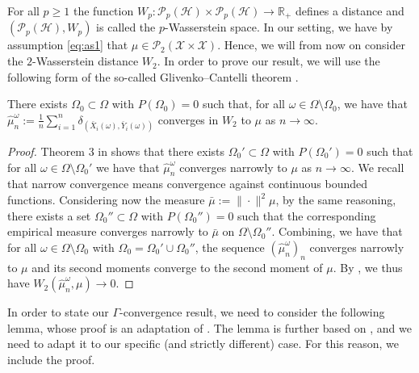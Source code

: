 \documentclass[onefignum,onetabnum]{siamonline250211}
\newcommand{\bX}{\bar{X}}
\newcommand{\bY}{\bar{Y}}
\newcommand{\cX}{\mathcal{X}}
\begin{document}
For all $p\geq 1$ the function $W_p: \mathcal{P}_p(\mathcal{H})\times \mathcal{P}_p(\mathcal{H}) \to \mathbb{R}_+$ defines a distance and $(\mathcal{P}_p(\mathcal{H}), W_p)$ is called the $p$-Wasserstein space. In our setting, we have by assumption \cref{eq:as1} that $\mu\in\mathcal{P}_2(\cX\times\cX)$. Hence, we will from now on consider the $2$-Wasserstein distance $W_2$. In order to prove our result, we will use the following form of the so-called Glivenko--Cantelli theorem \cite[Theorem 3]{Varadarajan}.

\begin{theorem}\label{thm:GliCa} There exists $\Omega_0\subset \Omega$ with $P(\Omega_0)=0$ such that, for all $\omega \in \Omega\setminus \Omega_0$, we have that $\hat \mu^\omega_n:=\frac{1}{n}\sum_{i=1}^n\delta_{(\bX_i(\omega), \bY_i(\omega))}$ converges in $W_2$ to $\mu$ as $n\to\infty$.
\end{theorem}
\begin{proof}
    Theorem 3 in \cite{Varadarajan} shows that there exists $\Omega_0'\subset \Omega$ with $P(\Omega_0')=0$ such that for all $\omega \in \Omega \setminus \Omega_0'$ we have that $\hat \mu^\omega_n$ converges narrowly to $\mu$ as $n\to \infty$. We recall that narrow convergence means convergence against continuous bounded functions. Considering now the measure $\bar \mu:=\|\cdot \|^2\mu$, by the same reasoning, there exists a set $\Omega_0''\subset \Omega$ with $P(\Omega_0'')=0$ such that the  corresponding empirical measure converges narrowly to $\bar \mu$ on $\Omega \setminus \Omega_0''$. Combining, we have that for all $\omega \in \Omega \setminus \Omega_0$ with $\Omega_0=\Omega_0'\cup \Omega_0''$, the sequence $(\hat \mu^\omega_n)_n$ converges narrowly to $\mu$ and its second moments converge to the second moment of $\mu$. By \cite[Theorem 6.9]{Villani2009}, we thus have $W_2(\hat \mu^\omega_n, \mu)\to 0$.
\end{proof}

In order to state our $\Gamma$-convergence result, we need to consider the following lemma, whose proof is an adaptation of \cite[Lemma 5]{Raginsky}. The lemma is further based on \cite[Proposition 1]{PolyanskiyWu}, and we need to adapt it to our specific (and strictly different) case. For this reason, we include the proof.
\end{document}
